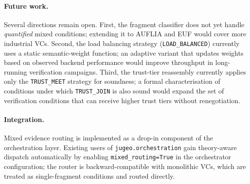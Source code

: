 \documentclass[11pt]{article}
\begin{document}
\paragraph{Future work.}
Several directions remain open.  First, the fragment classifier does
not yet handle \emph{quantified} mixed conditions; extending it to
AUFLIA and EUF would cover more industrial VCs.  Second, the load
balancing strategy (\texttt{LOAD\_BALANCED}) currently uses a static
semantic-weight function; an adaptive variant that updates weights
based on observed backend performance would improve throughput in
long-running verification campaigns.  Third, the trust-tier reassembly
currently applies only the \texttt{TRUST\_MEET} strategy for soundness;
a formal characterisation of conditions under which \texttt{TRUST\_JOIN}
is also sound would expand the set of verification conditions that can
receive higher trust tiers without renegotiation.

\paragraph{Integration.}
Mixed evidence routing is implemented as a drop-in component of the
\JuGeo{} orchestration layer.  Existing users of
\texttt{jugeo.orchestration} gain theory-aware dispatch automatically
by enabling \texttt{mixed\_routing=True} in the orchestrator
configuration; the router is backward-compatible with monolithic VCs,
which are treated as single-fragment conditions and routed directly.
\end{document}
